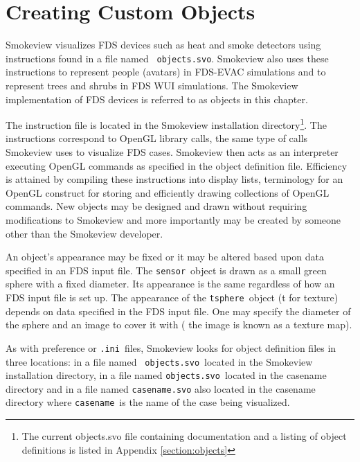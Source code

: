 \documentclass[11pt,twoside]{book}
\begin{document}

\chapter{Creating Custom Objects}
\label{chap:devices} Smokeview visualizes FDS devices such as heat
and smoke detectors using instructions found in a file named {\tt
objects.svo}. Smokeview also uses these instructions to represent
people (avatars) in FDS-EVAC simulations and to represent trees
and shrubs in FDS WUI simulations. The Smokeview implementation of
FDS devices is referred to as objects in this chapter.

The instruction file is located in the  Smokeview installation
directory\footnote{The current objects.svo file containing
documentation and a listing of object definitions is listed in
Appendix \ref{section:objects}}. The instructions correspond to
OpenGL library calls, the same type of calls Smokeview uses to
visualize FDS cases. Smokeview then acts as an interpreter
executing OpenGL commands as specified in the object definition
file. Efficiency is attained by compiling these instructions into
display lists, terminology for an OpenGL construct for storing and
efficiently drawing collections of OpenGL commands.  New objects
may be designed and drawn without requiring modifications to
Smokeview and more importantly may be created by someone other
than the Smokeview developer.

An object's appearance may be fixed or it may be altered based
upon data specified in an FDS input file.  The {\tt sensor}\
object is drawn as a small green sphere with a fixed diameter.
Its appearance is the same regardless of how an FDS input file is
set up. The appearance of the {\tt tsphere}\ object (t for
texture) depends on data specified in the FDS input file.  One may
specify the diameter of the sphere and an image to cover it with (
the image is known as a texture map).

As with preference or {\tt .ini}\ files, Smokeview looks for
object definition files in three locations: in a file named {\tt
objects.svo}\ located in the Smokeview installation directory, in
a file named {\tt objects.svo}\ located in the casename directory
and in a file named {\tt casename.svo} also located in the
casename directory where {\tt casename}\ is the name of the case
being visualized.
\end{document}
